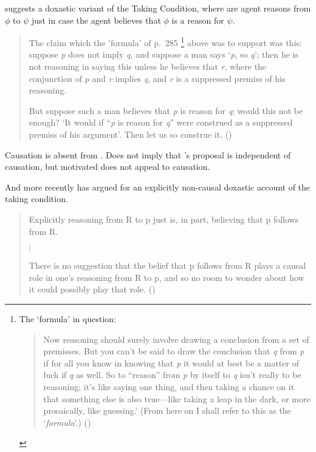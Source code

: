\begin{note}
  \citeauthor{Thomson:1965vv} suggests a doxastic variant of the Taking Condition, where are agent reasons from \(\phi\) to \(\psi\) just in case the agent believes that \(\phi\) is a reason for \(\psi\).
  \begin{quote}
    The claim which the 'formula' of p.\ 285\nolinebreak
    \footnote{
      The `formula' in question:
      \begin{quote}
    Now reasoning should surely involve drawing a conclusion from a set of premisses.
    But you can't be said to draw the conclusion that \emph{q} from \emph{p} if for all you know in knowing that \emph{p} it would at best be a matter of luck if \emph{q} as well.
    So to ``reason'' from \emph{p} by itself to \emph{q} isn't really to be reasoning; it's like saying one thing, and then taking a chance on it that something else is also true---like taking a leap in the dark, or more prosaically, like guessing.'
    (From here on I shall refer to this as the `\emph{formula}'.)\nolinebreak
    \mbox{}\hfill\mbox{(\citeyear[285]{Thomson:1965vv})}
  \end{quote}
}
    above was to support was this:
    suppose \emph{p} does not imply \emph{q}, and suppose a man says `\emph{p}, so \emph{q}';
    then he is not reasoning in saying this unless he believes that \emph{r}, where the conjunction of \emph{p} and \emph{r} implies \emph{q}, and \emph{r} is a suppressed premiss of his reasoning.\par
     But suppose such a man believes that \emph{p} is reason for \emph{q}; would this not be enough?
    `It would if ``\emph{p} is reason for \emph{q}'' were construed as a suppressed premiss of his argument'.
    Then let us so construe it.\newline
    \mbox{}\hfill\mbox{(\citeyear[294]{Thomson:1965vv})}
  \end{quote}
  Causation is absent from \citeauthor{Thomson:1965vv}.
  Does not imply that \citeauthor{Thomson:1965vv}'s proposal is independent of causation, but motivated does not appeal to causation.
\end{note}

\begin{note}
  And more recently \cite{Valaris:2014un} has argued for an explicitly non-causal doxastic account of the taking condition.

  \begin{quote}
    Explicitly reasoning from R to p just is, in part, believing that p follows from R.

    \mbox{}\hfill\(\vdots\)\hfill\mbox{}

    There is no suggestion that the belief that p follows from R plays a causal role in one’s reasoning from R to p, and so no room to wonder about how it could possibly play that role.\nolinebreak
    \mbox{}\hfill\mbox{(\citeyear[117--118]{Valaris:2014un})}
  \end{quote}
\end{note}

